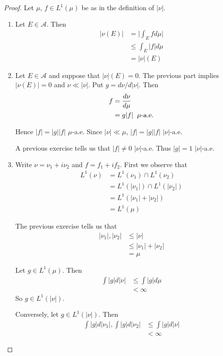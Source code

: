 \documentclass[12pt]{amsart}
\newcommand{\MA}{\mathcal{A}}
\begin{document}
\begin{proof}
Let $\mu$, $f \in L^1(\mu)$ be as in the definition of $|\nu|$.
\begin{enumerate}
\item Let $E \in \MA$. Then 
\begin{align*}
|\nu(E)| 
& = \bigg|\int_E f d\mu\bigg|\\
& \leq \int_E |f| d\mu\\
&= |\nu|(E)
\end{align*}

\item Let $E \in \MA$ and suppose that $|\nu|(E)=0$. The previous part implies $|\nu(E)|=0$ and $\nu \ll |\nu|$. Put $g = d \nu / d|\nu|$. Then 
\begin{align*}
f 
&= \frac{d\nu}{d\mu}\\
&= g|f| \hspace{2mm }\mu\text{-a.e.}
\end{align*}

Hence $|f| = |g||f|$ $\mu$-a.e. Since $|\nu| \ll \mu$, $|f| = |g||f|$ $|\nu|$-a.e.

A previous exercise tells us that $|f| \neq 0$ $|\nu|$-a.e. Thus $|g|=1$ $|\nu|$-a.e.\\

\item Write $\nu = \nu_1 + i\nu_2$ and $f = f_1 + if_2$. First we observe that
\begin{align*}
L^1(\nu)
&= L^1(\nu_1) \cap L^1(\nu_2) \\
&= L^1(|\nu_1|) \cap L^1(|\nu_2|)\\
&= L^1(|\nu_1| + |\nu_2|)\\
&= L^1(\mu)
\end{align*}

The previous exercise tells us that 
\begin{align*}
|\nu_1|, |\nu_2| 
&\leq |\nu| \\
&\leq |\nu_1|+ |\nu_2| \\
&= \mu
\end{align*}

Let $g \in L^1(\mu)$. Then 
\begin{align*}
\int |g| d |\nu| 
&\leq \int |g| d \mu \\
&< \infty
\end{align*}
So $g \in L^1(|\nu|)$.

Conversely, let $g \in L^1(|\nu|)$. Then 
\begin{align*}
\int |g| d|\nu_1|, \int |g| d |\nu_2| 
& \leq \int |g|d |\nu|\\
& < \infty
\end{align*}


\end{enumerate}
\end{proof}
\end{document}
